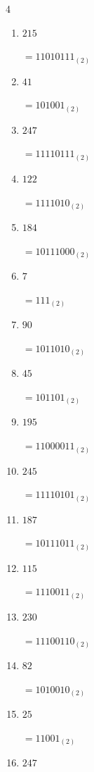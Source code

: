 \begin{multicols}{4}
\begin{enumerate}
        $=11001110_{(2)}$

  \item $215$

        $=11010111_{(2)}$

  \item $41$

        $=101001_{(2)}$

  \item $247$

        $=11110111_{(2)}$

  \item $122$

        $=1111010_{(2)}$

  \item $184$

        $=10111000_{(2)}$

  \item $7$

        $=111_{(2)}$

\columnbreak %

  \item $90$

        $=1011010_{(2)}$

  \item $45$

        $=101101_{(2)}$

  \item $195$

        $=11000011_{(2)}$

  \item $245$

        $=11110101_{(2)}$

  \item $187$

        $=10111011_{(2)}$

  \item $115$

        $=1110011_{(2)}$

  \item $230$

        $=11100110_{(2)}$

  \item $82$

        $=1010010_{(2)}$

  \item $25$

        $=11001_{(2)}$

  \item $247$


\end{enumerate}
\end{multicols}
